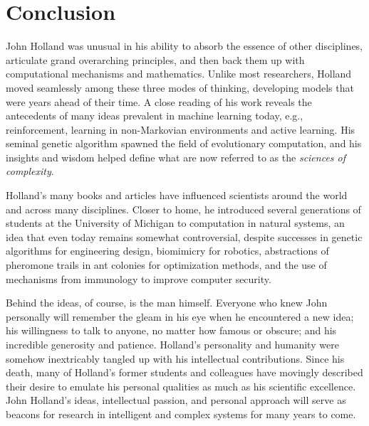 \documentclass{sig-alternate}
\begin{document}


\section{Conclusion}

John Holland was unusual in his ability to absorb the essence of other
disciplines, articulate grand overarching
principles, and then back them up with computational mechanisms and
mathematics.  Unlike most researchers, Holland moved seamlessly among these
three modes of thinking, developing models that were years ahead of their time.  A
close reading of his work reveals the antecedents of many ideas prevalent in
machine learning today, e.g., reinforcement, learning in non-Markovian
environments and active learning.   His seminal genetic algorithm
spawned the field of evolutionary computation, and his insights
and wisdom helped define what are now referred to as the
\emph{sciences of complexity}.   

Holland's many books and articles have influenced scientists around
the world and across many disciplines.  Closer to home, he introduced
several generations of students at the University of Michigan to
computation in natural systems, an idea that even today remains
somewhat controversial, despite successes in genetic algorithms for
engineering design, biomimicry for robotics, abstractions of pheromone
trails in ant colonies for optimization methods, and the use of
mechanisms from immunology to improve computer security.

Behind the ideas, of course, is the man himself.   Everyone who knew
John personally will remember the gleam in his eye when he
encountered a new idea; his willingness to talk to anyone, no matter
how famous or obscure; and his incredible generosity and patience.
Holland's personality and humanity were somehow inextricably tangled
up with his intellectual contributions.  Since his death, many of
Holland's former students and colleagues have movingly described their
desire to emulate his personal qualities as much as his scientific
excellence.  John Holland's ideas, intellectual passion, and personal approach will serve as
beacons for research in intelligent and complex systems for many
years to come. 
\end{document}
